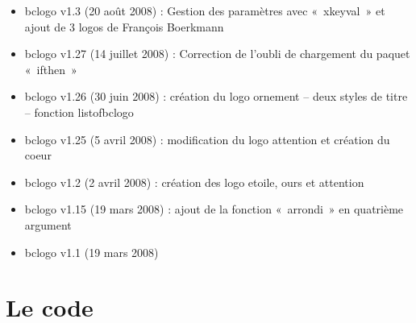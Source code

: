 \documentclass[a4paper,10pt,frenchb]{article}
\begin{document}
\begin{itemize}
  \item bclogo v1.3 (20 août 2008) : Gestion des paramètres avec
    « xkeyval » et ajout de 3 logos de François Boerkmann
  \item bclogo v1.27 (14 juillet 2008) : Correction de l'oubli de
    chargement du paquet « ifthen »
  \item bclogo v1.26 (30 juin 2008) : création du logo ornement --
    deux styles de titre -- fonction listofbclogo
  \item bclogo v1.25 (5 avril 2008) : modification du logo attention
    et création du coeur
  \item bclogo v1.2 (2 avril 2008) : création des logo etoile, ours et
    attention
  \item bclogo v1.15 (19 mars 2008) : ajout de la fonction « arrondi »
    en quatrième argument
  \item bclogo v1.1 (19 mars 2008)
\end{itemize}

\section{Le code}

\lstset{style=numbers, breaklines=true,breakindent=30pt}
\end{document}
